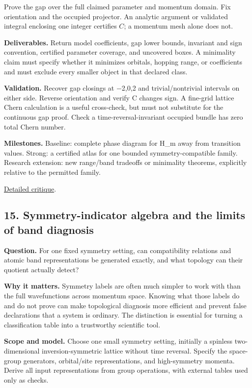 \documentclass[
  11pt,
]{article}
\begin{document}
Prove the gap over the full claimed parameter and momentum domain. Fix
orientation and the occupied projector. An analytic argument or
validated integral enclosing one integer certifies \(C\); a momentum
mesh alone does not.

\textbf{Deliverables.} Return model coefficients, gap lower bounds,
invariant and sign convention, certified parameter coverage, and
uncovered boxes. A minimality claim must specify whether it minimizes
orbitals, hopping range, or coefficients and must exclude every smaller
object in that declared class.

\textbf{Validation.} Recover gap closings at \ensuremath{-}2,0,2 and
trivial/nontrivial intervals on either side. Reverse orientation and
verify C changes sign. A fine-grid lattice Chern calculation is a useful
cross-check, but must not substitute for the continuous gap proof. Check
a time-reversal-invariant occupied bundle has zero total Chern number.

\textbf{Milestones.} Baseline: complete phase diagram for H\_m away from
transition values. Strong: a certified atlas for one bounded
symmetry-compatible family. Research extension: new range/band tradeoffs
or minimality theorems, explicitly relative to the permitted family.

\href{https://github.com/rick-stevens-ai/Pure-Thought/blob/main/reviews/09-Topological-Band-Theory.md}{Detailed
critique}.

\subsection{15. Symmetry-indicator algebra and the limits of band
diagnosis}

\textbf{Question.} For one fixed symmetry setting, can compatibility
relations and atomic band representations be generated exactly, and what
topology can their quotient actually detect?

\textbf{Why it matters.} Symmetry labels are often much simpler to work
with than the full wavefunctions across momentum space. Knowing what
those labels do and do not prove can make topological diagnosis more
efficient and prevent false declarations that a system is ordinary. The
distinction is essential for turning a classification table into a
trustworthy scientific tool.

\textbf{Scope and model.} Choose one small symmetry setting, initially a
spinless two-dimensional inversion-symmetric lattice without time
reversal. Specify the space-group generators, orbital/site
representations, and high-symmetry momenta. Derive all input
representations from group operations, with external tables used only as
checks.
\end{document}
